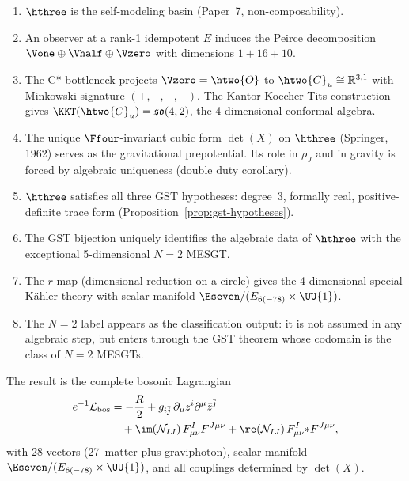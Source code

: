 \begin{enumerate}[label=(\roman*)]
\item $\hthree$ is the self-modeling basin (Paper~7, non-composability).

\item An observer at a rank-1 idempotent $E$ induces the Peirce
  decomposition $\Vone \oplus \Vhalf \oplus \Vzero$ with dimensions
  $1 + 16 + 10$.

\item The C*-bottleneck projects $\Vzero = \htwo{O}$ to
  $\htwo{C}_u \cong \mathbb{R}^{3,1}$ with Minkowski signature
  $(+,-,-,-)$. The Kantor-Koecher-Tits construction gives
  $\KKT(\htwo{C}_u) = \mathfrak{so}(4,2)$, the 4-dimensional
  conformal algebra.

\item The unique $\Ffour$-invariant cubic form $\det(X)$ on $\hthree$
  (Springer, 1962) serves as the gravitational prepotential.
  Its role in $\rho_J$ and in gravity is forced by algebraic
  uniqueness (double duty corollary).

\item $\hthree$ satisfies all three GST hypotheses: degree~3, formally
  real, positive-definite trace form
  (Proposition~\ref{prop:gst-hypotheses}).

\item The GST bijection uniquely identifies the algebraic data of
  $\hthree$ with the exceptional 5-dimensional $N{=}2$ MESGT.

\item The $r$-map (dimensional reduction on a circle) gives the
  4-dimensional special K\"ahler theory with scalar manifold
  $\Eseven / (E_{6(-78)} \times \UU{1})$.

\item The $N{=}2$ label appears as the classification output: it is
  not assumed in any algebraic step, but enters through the GST
  theorem whose codomain is the class of $N{=}2$ MESGTs.
\end{enumerate}

The result is the complete bosonic Lagrangian
\begin{align}
\label{eq:lagrangian-preview}
e^{-1}\mathcal{L}_{\mathrm{bos}} &= -\frac{R}{2}
  + g_{i\bar{j}}\,\partial_\mu z^i \partial^\mu \bar{z}^{\bar{j}}
  \nonumber\\
  &\quad + \im(\mathcal{N}_{IJ})\, F^I_{\mu\nu} F^{J\mu\nu}
  + \re(\mathcal{N}_{IJ})\, F^I_{\mu\nu} {*F}^{J\mu\nu},
\end{align}
with 28 vectors (27~matter plus graviphoton), scalar manifold
$\Eseven / (E_{6(-78)} \times \UU{1})$, and all couplings determined
by $\det(X)$.


